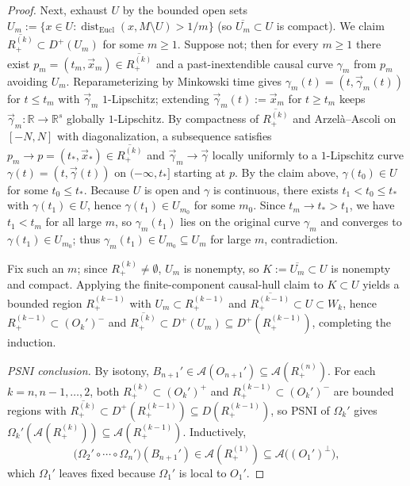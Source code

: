 \documentclass[11pt,a4paper]{article}
\theoremstyle{definition}
\theoremstyle{remark}
\newcommand{\Ac}{\mathcal{A}}
\newcommand{\RR}{\mathbb{R}}
\newcommand{\dist}{\operatorname{dist}}
\begin{document}
\begin{proof}
Next, exhaust $U$ by the bounded open sets $U_m := \{x\in U : \dist_{\mathrm{Eucl}}(x, M\setminus U) > 1/m\}$ (so $\overline{U_m}\subset U$ is compact). We claim $\overline{R_+^{(k)}}\subset D^+(U_m)$ for some $m\ge 1$. Suppose not; then for every $m\ge 1$ there exist $p_m=(t_m,\vec{x}_m)\in\overline{R_+^{(k)}}$ and a past-inextendible causal curve $\gamma_m$ from $p_m$ avoiding $U_m$. Reparameterizing by Minkowski time gives $\gamma_m(t) = (t, \vec{\gamma}_m(t))$ for $t\le t_m$ with $\vec{\gamma}_m$ $1$-Lipschitz; extending $\vec{\gamma}_m(t):=\vec{x}_m$ for $t\ge t_m$ keeps $\vec{\gamma}_m:\RR\to\RR^s$ globally $1$-Lipschitz. By compactness of $\overline{R_+^{(k)}}$ and Arzel\`a--Ascoli on $[-N,N]$ with diagonalization, a subsequence satisfies $p_m\to p=(t_*,\vec{x}_*)\in\overline{R_+^{(k)}}$ and $\vec{\gamma}_m\to\vec{\gamma}$ locally uniformly to a $1$-Lipschitz curve $\gamma(t)=(t,\vec{\gamma}(t))$ on $(-\infty,t_*]$ starting at $p$. By the claim above, $\gamma(t_0)\in U$ for some $t_0\le t_*$. Because $U$ is open and $\gamma$ is continuous, there exists $t_1 < t_0 \le t_*$ with $\gamma(t_1)\in U$, hence $\gamma(t_1)\in U_{m_0}$ for some $m_0$. Since $t_m\to t_* > t_1$, we have $t_1 < t_m$ for all large $m$, so $\gamma_m(t_1)$ lies on the original curve $\gamma_m$ and converges to $\gamma(t_1)\in U_{m_0}$; thus $\gamma_m(t_1)\in U_{m_0}\subseteq U_m$ for large $m$, contradiction.

Fix such an $m$; since $R_+^{(k)}\neq\emptyset$, $U_m$ is nonempty, so $K := \overline{U_m}\subset U$ is nonempty and compact. Applying the finite-component causal-hull claim to $K\subset U$ yields a bounded region $R_+^{(k-1)}$ with $U_m\subset R_+^{(k-1)}$ and $\overline{R_+^{(k-1)}}\subset U\subset W_k$, hence $R_+^{(k-1)}\subset (O_k')^-$ and $\overline{R_+^{(k)}}\subset D^+(U_m)\subseteq D^+(R_+^{(k-1)})$, completing the induction.

\smallskip\noindent\emph{PSNI conclusion.}
By isotony, $B_{n+1}'\in\Ac(O_{n+1}')\subseteq\Ac(R_+^{(n)})$. For each $k=n,n-1,\dots,2$, both $R_+^{(k)}\subset (O_k')^+$ and $R_+^{(k-1)}\subset (O_k')^-$ are bounded regions with $\overline{R_+^{(k)}}\subset D^+(R_+^{(k-1)})\subseteq D(R_+^{(k-1)})$, so PSNI of $\Omega_k'$ gives $\Omega_k'(\Ac(R_+^{(k)}))\subseteq\Ac(R_+^{(k-1)})$. Inductively,
\[
\bigl(\Omega_2'\circ\cdots\circ\Omega_n'\bigr)(B_{n+1}') \in \Ac(R_+^{(1)}) \subseteq \Ac\bigl((O_1')^\perp\bigr),
\]
which $\Omega_1'$ leaves fixed because $\Omega_1'$ is local to $O_1'$.
\end{proof}
\end{document}
